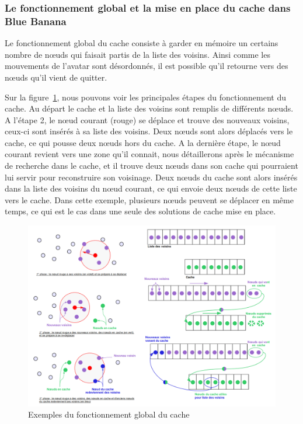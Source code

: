 \subsubsection{Le fonctionnement global et la mise en place du cache dans Blue Banana}
Le fonctionnement global du cache consiste à garder en mémoire un certains nombre de nœuds qui faisait partis de la liste des voisins. Ainsi comme les mouvements de l'avatar sont désordonnés, il est possible qu'il retourne vers des nœuds qu'il vient de quitter. 
\par Sur la figure~\ref{cacheW}, nous pouvons voir les principales étapes du fonctionnement du cache. Au départ le cache et la liste des voisins sont remplis de différents nœuds. A l'étape 2, le nœud courant (rouge) se déplace et trouve des nouveaux voisins, ceux-ci sont insérés à sa liste des voisins. Deux nœuds sont alors déplacés vers le cache, ce qui pousse deux nœuds hors du cache. A la dernière étape, le nœud courant revient vers une zone qu'il connait, nous détaillerons après le mécanisme de recherche dans le cache, et il trouve deux nœuds dans son cache qui pourraient lui servir pour reconstruire son voisinage. Deux nœuds du cache sont alors insérés dans la liste des voisins du nœud courant, ce qui envoie deux nœuds de cette liste vers le cache. Dans cette exemple, plusieurs nœuds peuvent se déplacer en même temps, ce qui est le cas dans une seule des solutions de cache mise en place.
	\begin{figure}[!h]
        \centering
        \includegraphics[scale=0.35]{./Ressources/Images/cacheWextends.png}
        \caption{Exemples du fonctionnement global du cache}
        \label{cacheW}
        \end{figure} 
